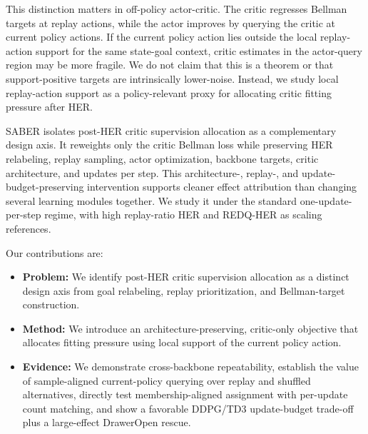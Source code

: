 \documentclass[letterpaper]{article}
\begin{document}
This distinction matters in off-policy actor-critic. The critic regresses Bellman targets at replay actions, while the actor improves by querying the critic at current policy actions. If the current policy action lies outside the local replay-action support for the same state-goal context, critic estimates in the actor-query region may be more fragile. We do not claim that this is a theorem or that support-positive targets are intrinsically lower-noise. Instead, we study local replay-action support as a policy-relevant proxy for allocating critic fitting pressure after HER.

SABER isolates post-HER critic supervision allocation as a complementary design axis. It reweights only the critic Bellman loss while preserving HER relabeling, replay sampling, actor optimization, backbone targets, critic architecture, and updates per step. This architecture-, replay-, and update-budget-preserving intervention supports cleaner effect attribution than changing several learning modules together. We study it under the standard one-update-per-step regime, with high replay-ratio HER and REDQ-HER as scaling references.

Our contributions are:
\begin{itemize}
    \item \textbf{Problem:} We identify post-HER critic supervision allocation as a distinct design axis from goal relabeling, replay prioritization, and Bellman-target construction.
    \item \textbf{Method:} We introduce an architecture-preserving, critic-only objective that allocates fitting pressure using local support of the current policy action.
    \item \textbf{Evidence:} We demonstrate cross-backbone repeatability, establish the value of sample-aligned current-policy querying over replay and shuffled alternatives, directly test membership-aligned assignment with per-update count matching, and show a favorable DDPG/TD3 update-budget trade-off plus a large-effect DrawerOpen rescue.
\end{itemize}
\end{document}
